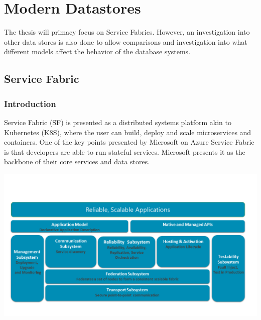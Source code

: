 \documentclass[a4paper,10pt,titlepage]{report}
\begin{document}






    \newpage


    \chapter{Modern Datastores}

    The thesis will primacy focus on Service Fabrics. However, an investigation into other data stores is also done to allow comparisons and investigation into what different models affect the behavior of the database systems.


    \section{Service Fabric}

    \subsection{Introduction}

    Service Fabric (SF) is presented as a distributed systems platform akin to Kubernetes (K8S), where the user can build, deploy and scale microservices and containers. One of the key points presented by Microsoft on Azure Service Fabric is that developers are able to run stateful services. Microsoft presents it as the backbone of their core services and data stores.\\
    \vspace{5mm}

    \includegraphics[scale=0.5]{images/service-fabric-architecture.png}
\end{document}
